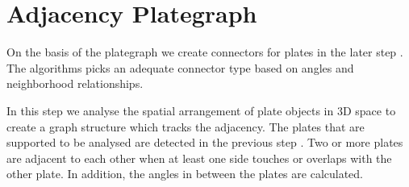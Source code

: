 \documentclass[../ClassicThesis.tex]{subfiles}
\begin{document}
\chapter{Adjacency Plategraph}\label{ch:graph}
\newcommand{\TODO}[1]{\textcolor{red}{\\ \textbf{TODO:} #1 \\}}





On the basis of the plategraph we create connectors for plates in the later step . The algorithms picks an adequate connector type based on angles and neighborhood relationships.

In this step we analyse the spatial arrangement of plate objects in 3D space to create a graph structure which tracks the adjacency. The plates that are supported to be analysed are detected in the previous step . Two or more plates are adjacent to each other when at least one side touches or overlaps with the other plate. In addition, the angles in between the plates are calculated.
\end{document}
